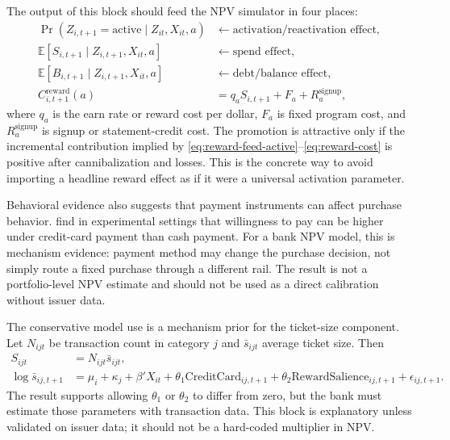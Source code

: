 \documentclass[11pt]{article}
\newcommand{\E}{\mathbb{E}}
\newcommand{\1}{\mathbf{1}}
\begin{document}
The output of this block should feed the NPV simulator in four places:
\begin{align}
  \Pr(Z_{i,t+1}=\mathrm{active}\mid Z_{it},X_{it},a)
    &\leftarrow
      \text{activation/reactivation effect}, \label{eq:reward-feed-active}\\
  \E[S_{i,t+1}\mid Z_{i,t+1},X_{it},a]
    &\leftarrow
      \text{spend effect}, \label{eq:reward-feed-spend}\\
  \E[B_{i,t+1}\mid Z_{i,t+1},X_{it},a]
    &\leftarrow
      \text{debt/balance effect}, \label{eq:reward-feed-balance}\\
  C^{\mathrm{reward}}_{i,t+1}(a)
    &= q_a S_{i,t+1} + F_a + R^{\mathrm{signup}}_a,
      \label{eq:reward-cost}
\end{align}
where $q_a$ is the earn rate or reward cost per dollar, $F_a$ is fixed program
cost, and $R^{\mathrm{signup}}_a$ is signup or statement-credit cost. The
promotion is attractive only if the incremental contribution implied by
\eqref{eq:reward-feed-active}--\eqref{eq:reward-cost} is positive after
cannibalization and losses. This is the concrete way to avoid importing a
headline reward effect as if it were a universal activation parameter.

Behavioral evidence also suggests that payment instruments can affect purchase
behavior. \citet{prelec2001creditcard} find in experimental settings that
willingness to pay can be higher under credit-card payment than cash payment.
For a bank NPV model, this is mechanism evidence: payment method may change the
purchase decision, not simply route a fixed purchase through a different rail.
The result is not a portfolio-level NPV estimate and should not be used as a
direct calibration without issuer data.

The conservative model use is a mechanism prior for the ticket-size component.
Let $N_{ijt}$ be transaction count in category $j$ and $\bar{s}_{ijt}$ average
ticket size. Then
\begin{align}
  S_{ijt} &= N_{ijt}\bar{s}_{ijt}, \label{eq:spend-count-ticket}\\
  \log \bar{s}_{ij,t+1}
    &= \mu_i+\kappa_j+\beta'X_{it}
       +\theta_1 \mathrm{CreditCard}_{ij,t+1}
       +\theta_2 \mathrm{RewardSalience}_{ij,t+1}
       +\epsilon_{ij,t+1}.
       \label{eq:ticket-size-payment}
\end{align}
The \citet{prelec2001creditcard} result supports allowing
$\theta_1$ or $\theta_2$ to differ from zero, but the bank must estimate those
parameters with transaction data. This block is explanatory unless validated on
issuer data; it should not be a hard-coded multiplier in NPV.
\end{document}
